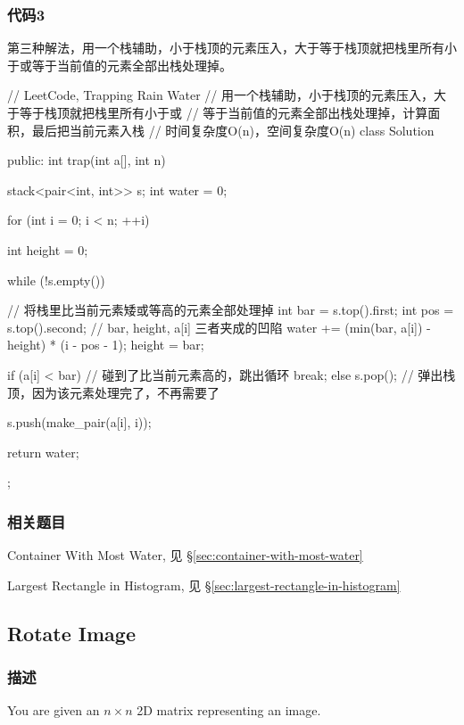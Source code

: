 \subsubsection{代码3}
第三种解法，用一个栈辅助，小于栈顶的元素压入，大于等于栈顶就把栈里所有小于或等于当前值的元素全部出栈处理掉。
\begin{Code}
// LeetCode, Trapping Rain Water
// 用一个栈辅助，小于栈顶的元素压入，大于等于栈顶就把栈里所有小于或
// 等于当前值的元素全部出栈处理掉，计算面积，最后把当前元素入栈
// 时间复杂度O(n)，空间复杂度O(n)
class Solution {
public:
    int trap(int a[], int n) {
        stack<pair<int, int>> s;
        int water = 0;

        for (int i = 0; i < n; ++i) {
            int height = 0;

            while (!s.empty()) { // 将栈里比当前元素矮或等高的元素全部处理掉
                int bar = s.top().first;
                int pos = s.top().second;
                // bar, height, a[i] 三者夹成的凹陷
                water += (min(bar, a[i]) - height) * (i - pos - 1);
                height = bar;

                if (a[i] < bar) // 碰到了比当前元素高的，跳出循环
                    break;
                else
                    s.pop(); // 弹出栈顶，因为该元素处理完了，不再需要了
            }

            s.push(make_pair(a[i], i));
        }

        return water;
    }
};
\end{Code}


\subsubsection{相关题目}
\begindot
\item Container With Most Water, 见 \S \ref{sec:container-with-most-water}
\item Largest Rectangle in Histogram, 见 \S \ref{sec:largest-rectangle-in-histogram}
\myenddot


\subsection{Rotate Image} %
\label{sec:rotate-image}


\subsubsection{描述}
You are given an $n \times n$ 2D matrix representing an image.

